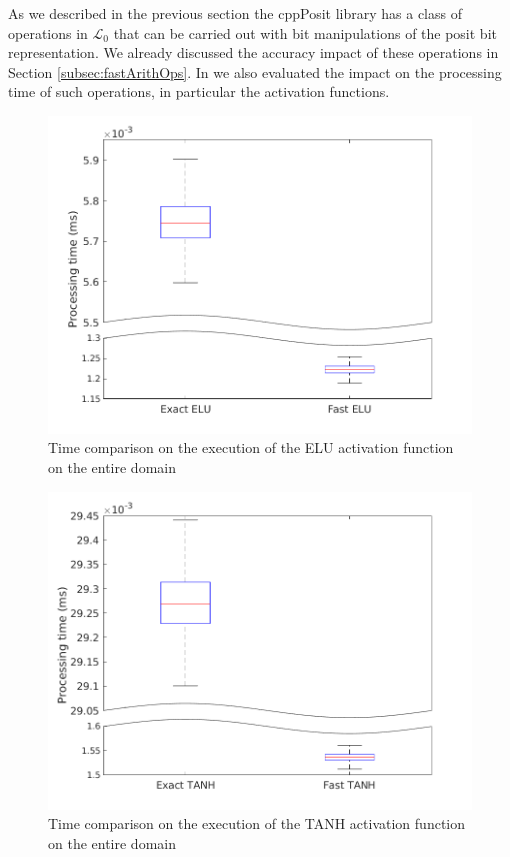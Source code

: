 As we described in the previous section the cppPosit library has a class of operations in $\mathcal{L}_0$ that can be carried out with bit manipulations of the posit bit representation. We already discussed the accuracy impact of these operations in Section \ref{subsec:fastArithOps}. In \cite{coco_et_al_jrtip_2020, coco2020sensors} we also evaluated the impact on the processing time of such operations, in particular the activation functions.

\begin{figure}
    \centering
\includegraphics[width=\linewidth]{img/eluTimeComparison.png}
    \caption{Time comparison on the execution of the ELU activation function on the entire  domain}
    \label{fig:posit80EluTimeComparison}
\end{figure}

\begin{figure}
    \centering
\includegraphics[width=\linewidth]{img/tanhTimeComparison.png}
    \caption{Time comparison on the execution of the TANH activation function on the entire  domain}
    \label{fig:posit80ETanhTimeComparison}
\end{figure}

